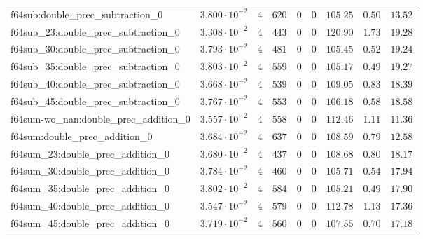 \begin{tabular}{|l|c|c|c|c|c|c|c|c|}
f64sub:double\_prec\_subtraction\_0            & $ 3.800 \cdot 10^{-2} $ & $ 4      $ & $ 620   $ & $ 0   $ & $ 0      $ & $ 105.25      $ & $ 0.50    $ & $ 13.52   $ \\
f64sub\_23:double\_prec\_subtraction\_0        & $ 3.308 \cdot 10^{-2} $ & $ 4      $ & $ 443   $ & $ 0   $ & $ 0      $ & $ 120.90      $ & $ 1.73    $ & $ 19.28   $ \\
f64sub\_30:double\_prec\_subtraction\_0        & $ 3.793 \cdot 10^{-2} $ & $ 4      $ & $ 481   $ & $ 0   $ & $ 0      $ & $ 105.45      $ & $ 0.52    $ & $ 19.24   $ \\
f64sub\_35:double\_prec\_subtraction\_0        & $ 3.803 \cdot 10^{-2} $ & $ 4      $ & $ 559   $ & $ 0   $ & $ 0      $ & $ 105.17      $ & $ 0.49    $ & $ 19.27   $ \\
f64sub\_40:double\_prec\_subtraction\_0        & $ 3.668 \cdot 10^{-2} $ & $ 4      $ & $ 539   $ & $ 0   $ & $ 0      $ & $ 109.05      $ & $ 0.83    $ & $ 18.39   $ \\
f64sub\_45:double\_prec\_subtraction\_0        & $ 3.767 \cdot 10^{-2} $ & $ 4      $ & $ 553   $ & $ 0   $ & $ 0      $ & $ 106.18      $ & $ 0.58    $ & $ 18.58   $ \\
f64sum-wo\_nan:double\_prec\_addition\_0       & $ 3.557 \cdot 10^{-2} $ & $ 4      $ & $ 558   $ & $ 0   $ & $ 0      $ & $ 112.46      $ & $ 1.11    $ & $ 11.36   $ \\
f64sum:double\_prec\_addition\_0               & $ 3.684 \cdot 10^{-2} $ & $ 4      $ & $ 637   $ & $ 0   $ & $ 0      $ & $ 108.59      $ & $ 0.79    $ & $ 12.58   $ \\
f64sum\_23:double\_prec\_addition\_0           & $ 3.680 \cdot 10^{-2} $ & $ 4      $ & $ 437   $ & $ 0   $ & $ 0      $ & $ 108.68      $ & $ 0.80    $ & $ 18.17   $ \\
f64sum\_30:double\_prec\_addition\_0           & $ 3.784 \cdot 10^{-2} $ & $ 4      $ & $ 460   $ & $ 0   $ & $ 0      $ & $ 105.71      $ & $ 0.54    $ & $ 17.94   $ \\
f64sum\_35:double\_prec\_addition\_0           & $ 3.802 \cdot 10^{-2} $ & $ 4      $ & $ 584   $ & $ 0   $ & $ 0      $ & $ 105.21      $ & $ 0.49    $ & $ 17.90   $ \\
f64sum\_40:double\_prec\_addition\_0           & $ 3.547 \cdot 10^{-2} $ & $ 4      $ & $ 579   $ & $ 0   $ & $ 0      $ & $ 112.78      $ & $ 1.13    $ & $ 17.36   $ \\
f64sum\_45:double\_prec\_addition\_0           & $ 3.719 \cdot 10^{-2} $ & $ 4      $ & $ 560   $ & $ 0   $ & $ 0      $ & $ 107.55      $ & $ 0.70    $ & $ 17.18   $ \\

\end{tabular}
